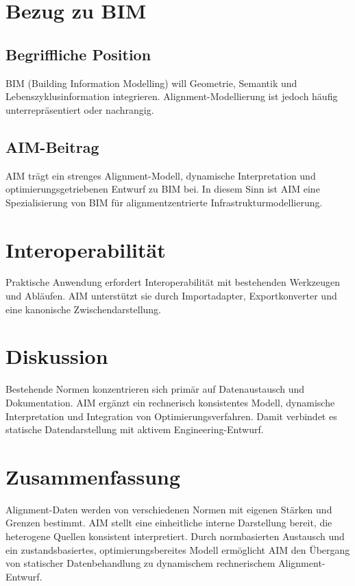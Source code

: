 \section{Bezug zu BIM}
\subsection{Begriffliche Position}
BIM (Building Information Modelling) will Geometrie, Semantik und
Lebenszyklusinformation integrieren. Alignment-Modellierung ist jedoch häufig
unterrepräsentiert oder nachrangig.

\subsection{AIM-Beitrag}
AIM trägt ein strenges Alignment-Modell, dynamische Interpretation und
optimierungsgetriebenen Entwurf zu BIM bei. In diesem Sinn ist AIM eine
Spezialisierung von BIM für alignmentzentrierte Infrastrukturmodellierung.

\section{Interoperabilität}
Praktische Anwendung erfordert Interoperabilität mit bestehenden Werkzeugen
und Abläufen. AIM unterstützt sie durch Importadapter, Exportkonverter und eine
kanonische Zwischendarstellung.

\section{Diskussion}
Bestehende Normen konzentrieren sich primär auf Datenaustausch und
Dokumentation. AIM ergänzt ein rechnerisch konsistentes Modell, dynamische
Interpretation und Integration von Optimierungsverfahren. Damit verbindet es
statische Datendarstellung mit aktivem Engineering-Entwurf.

\section{Zusammenfassung}
\begin{summary}
Alignment-Daten werden von verschiedenen Normen mit eigenen Stärken und
Grenzen bestimmt. AIM stellt eine einheitliche interne Darstellung bereit, die
heterogene Quellen konsistent interpretiert. Durch normbasierten Austausch und
ein zustandsbasiertes, optimierungsbereites Modell ermöglicht AIM den Übergang
von statischer Datenbehandlung zu dynamischem rechnerischem Alignment-Entwurf.
\end{summary}
